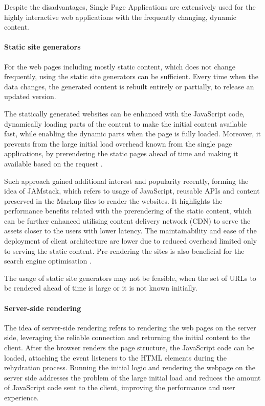 Despite the disadvantages, Single Page Applications are extensively used for the highly interactive web applications with the frequently changing, dynamic content.

\paragraph*{Static site generators}

For the web pages including mostly static content, which does not change frequently, using the static site generators can be sufficient. Every time when the data changes, the generated content is rebuilt entirely or partially, to release an updated version.

The statically generated websites can be enhanced with the JavaScript code, dynamically loading parts of the content to make the initial content available fast, while enabling the dynamic parts when the page is fully loaded. Moreover, it prevents from the large initial load overhead known from the single page applications, by prerendering the static pages ahead of time and making it available based on the request \cite{GoogleRenderingOnTheWeb}.

Such approach gained additional interest and popularity recently, forming the idea of JAMstack, which refers to usage of JavaScript, reusable APIs and content preserved in the Markup files to render the websites. It highlights the performance benefits related with the prerendering of the static content, which can be further enhanced utilising content delivery network (CDN) to serve the assets closer to the users with lower latency. The maintainability and ease of the deployment of client architecture are lower due to reduced overhead limited only to serving the static content. Pre-rendering the sites is also beneficial for the search engine optimisation \cite{JAMstack}.

The usage of static site generators may not be feasible, when the set of URLs to be rendered ahead of time is large or it is not known initially.

\paragraph*{Server-side rendering}

The idea of server-side rendering refers to rendering the web pages on the server side, leveraging the reliable connection and returning the initial content to the client. After the browser renders the page structure, the JavaScript code can be loaded, attaching the event listeners to the HTML elements during the rehydration process. Running the initial logic and rendering the webpage on the server side addresses the problem of the large initial load and reduces the amount of JavaScript code sent to the client, improving the performance and user experience.


